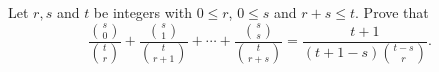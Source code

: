 Let $r,s$ and $t$ be integers with $0 \leq r$, $0 \leq s$ and $r+s
\leq t$. Prove that
\[
\frac{\binom s0}{\binom tr}
+ \frac{\binom s1}{\binom{t}{r+1}} + \cdots
+ \frac{\binom ss}{\binom{t}{r+s}}
= \frac{t+1}{(t+1-s)\binom{t-s}{r}}.
\]
